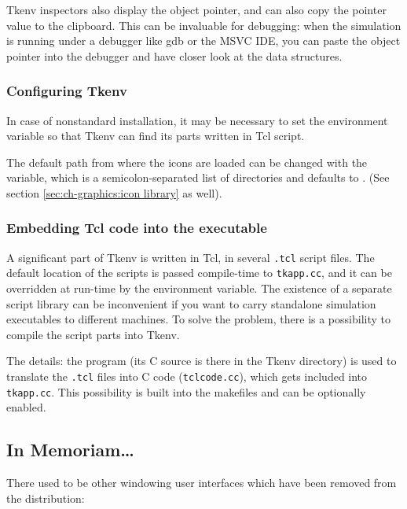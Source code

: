 Tkenv inspectors also display the object pointer, and can also copy
the pointer value to the clipboard. This can be invaluable for debugging:
when the simulation is running under a debugger like gdb or the MSVC IDE,
you can paste the object pointer into the debugger and have closer look
at the data structures.


\subsubsection{Configuring Tkenv}


In case of nonstandard installation, it may be necessary to set the
 environment variable so that Tkenv can find
its parts written in Tcl script.

The default path from where the icons are loaded can be changed with
the  variable, which is a
semicolon-separated list of directories and defaults to
. (See section
\ref{sec:ch-graphics:icon library} as well).



\subsubsection{Embedding Tcl code into the executable}

A significant part of Tkenv is written in Tcl, in several
\texttt{.tcl} script files. The default location of the scripts is
passed compile-time to \texttt{tkapp.cc}, and it can be overridden at
run-time by the  environment variable. The
existence of a separate script library can be inconvenient if you want
to carry standalone simulation executables to different machines. To
solve the problem, there is a possibility to compile the script parts
into Tkenv.

The details: the  program (its C source is there in the
Tkenv directory) is used to translate the \texttt{.tcl} files into C
code (\texttt{tclcode.cc}), which gets included into
\texttt{tkapp.cc}. This possibility is built into the makefiles
and can be optionally enabled.

\subsection{In Memoriam\dots }

There used to be other windowing user interfaces which have been removed
from the distribution:

